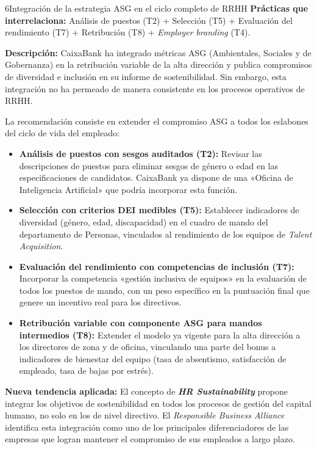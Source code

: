 \begin{recomendacion}{6}{Integración de la estrategia ASG en el ciclo completo de RRHH}
\textbf{Prácticas que interrelaciona:} Análisis de puestos (T2) + Selección (T5) + Evaluación del
rendimiento (T7) + Retribución (T8) + \textit{Employer branding} (T4).

\medskip
\textbf{Descripción:}
CaixaBank ha integrado métricas ASG (Ambientales, Sociales y de Gobernanza) en
la retribución variable de la alta dirección y publica compromisos de diversidad
e inclusión en su informe de sostenibilidad. Sin embargo, esta integración no
ha permeado de manera consistente en los procesos operativos de RRHH.

La recomendación consiste en extender el compromiso ASG a todos los eslabones
del ciclo de vida del empleado:
\begin{itemize}
  \item \textbf{Análisis de puestos con sesgos auditados (T2):} Revisar las
        descripciones de puestos para eliminar sesgos de género o edad en
        las especificaciones de candidatos. CaixaBank ya dispone de una
        «Oficina de Inteligencia Artificial» que podría incorporar esta función.
  \item \textbf{Selección con criterios DEI medibles (T5):} Establecer
        indicadores de diversidad (género, edad, discapacidad) en el cuadro de
        mando del departamento de Personas, vinculados al rendimiento de los
        equipos de \textit{Talent Acquisition}.
  \item \textbf{Evaluación del rendimiento con competencias de inclusión (T7):}
        Incorporar la competencia «gestión inclusiva de equipos» en la evaluación
        de todos los puestos de mando, con un peso específico en la puntuación
        final que genere un incentivo real para los directivos.
  \item \textbf{Retribución variable con componente ASG para mandos intermedios (T8):}
        Extender el modelo ya vigente para la alta dirección a los directores
        de zona y de oficina, vinculando una parte del bonus a indicadores
        de bienestar del equipo (tasa de absentismo, satisfacción de empleado,
        tasa de bajas por estrés).
\end{itemize}
\textbf{Nueva tendencia aplicada:}
El concepto de \textbf{\textit{HR Sustainability}} propone integrar los objetivos
de sostenibilidad en todos los procesos de gestión del capital humano, no solo
en los de nivel directivo. El \textit{Responsible Business Alliance} identifica
esta integración como uno de los principales diferenciadores de las empresas
que logran mantener el compromiso de sus empleados a largo plazo.
\end{recomendacion}

